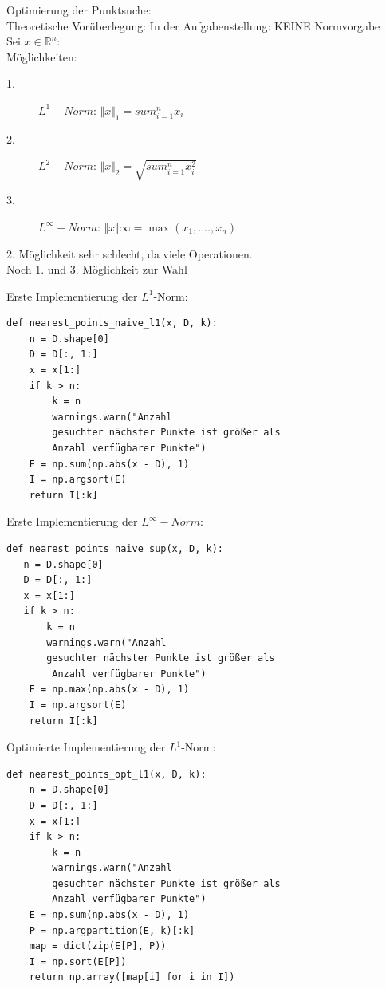 \documentclass{beamer}
\begin{document}
\begin{frame}[fragile]
Optimierung der Punktsuche:\\
Theoretische Vorüberlegung:
In der Aufgabenstellung: KEINE Normvorgabe\\
Sei $ x \in \mathbb{R} ^n$:\\
Möglichkeiten:
\begin{description}
\item[1.] $L^1-Norm$: $\Vert x\Vert _{1}= sum_{i=1}^n x_i $
\item[2.] $L^2-Norm$:  $\Vert x\Vert _{2}=\sqrt{ sum_{i=1}^n x_i ^2} $
\item[3.] $L^{\infty}-Norm$:  $\Vert x\Vert {\infty}= \max(x_1,....,x_n)$
\end{description}
2. Möglichkeit sehr schlecht, da viele Operationen.\\
Noch 1. und 3. Möglichkeit zur Wahl
\end{frame}


\begin{frame}[fragile]
Erste Implementierung der $L^1$-Norm:
\begin{verbatim}
def nearest_points_naive_l1(x, D, k):
    n = D.shape[0]
    D = D[:, 1:]
    x = x[1:]
    if k > n:
        k = n  
        warnings.warn("Anzahl
        gesuchter nächster Punkte ist größer als
        Anzahl verfügbarer Punkte")
    E = np.sum(np.abs(x - D), 1)
    I = np.argsort(E)
    return I[:k]
\end{verbatim}
\end{frame}



\begin{frame}[fragile]
Erste Implementierung der $L^{\infty}-Norm$:
\begin{verbatim}
def nearest_points_naive_sup(x, D, k):
   n = D.shape[0]
   D = D[:, 1:]
   x = x[1:]
   if k > n:
       k = n 
       warnings.warn("Anzahl
       gesuchter nächster Punkte ist größer als 
        Anzahl verfügbarer Punkte")
    E = np.max(np.abs(x - D), 1)
    I = np.argsort(E)
    return I[:k]
\end{verbatim} 
\end{frame}

\begin{frame}[fragile]
Optimierte Implementierung der $L^1$-Norm:
\begin{verbatim}
def nearest_points_opt_l1(x, D, k):
    n = D.shape[0]
    D = D[:, 1:]
    x = x[1:]
    if k > n:
        k = n  
        warnings.warn("Anzahl
        gesuchter nächster Punkte ist größer als
        Anzahl verfügbarer Punkte")
    E = np.sum(np.abs(x - D), 1)
    P = np.argpartition(E, k)[:k]
    map = dict(zip(E[P], P))
    I = np.sort(E[P])
    return np.array([map[i] for i in I])
\end{verbatim}
\end{frame}
\end{document}
